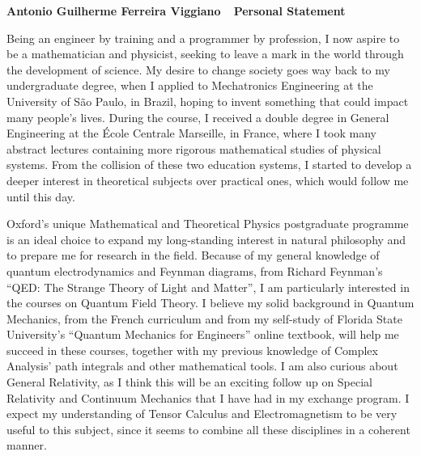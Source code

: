 \documentclass[10pt]{article}
\def\firstname{Antonio Guilherme }
\def\familyname{Ferreira Viggiano}
\def\subj{Personal Statement}
\def\FileTitle{\firstname\familyname~\textemdash~\subj}
\begin{document}
\sffamily %

{\bfseries \FileTitle}

Being an engineer by training and a programmer by profession, I now aspire to be a mathematician and physicist, seeking to leave a mark in the world through the development of science. My desire to change society goes way back to my undergraduate degree, when I applied to Mechatronics Engineering at the University of São Paulo, in Brazil, hoping to invent something that could impact many people's lives. During the course, I received a double degree in General Engineering at the École Centrale Marseille, in France, where I took many abstract lectures containing more rigorous mathematical studies of physical systems. From the collision of these two education systems, I started to develop a deeper interest in theoretical subjects over practical ones, which would follow me until this day.

Oxford's unique Mathematical and Theoretical Physics postgraduate programme is an ideal choice to expand my long-standing interest in natural philosophy and to prepare me for research in the field. Because of my general knowledge of quantum electrodynamics and Feynman diagrams, from Richard Feynman's ``QED: The Strange Theory of Light and Matter'', I am particularly interested in the courses on Quantum Field Theory. I believe my solid background in Quantum Mechanics, from the French curriculum and from my self-study of Florida State University's ``Quantum Mechanics for Engineers'' online textbook, will help me succeed in these courses, together with my previous knowledge of Complex Analysis' path integrals and other mathematical tools. I am also curious about General Relativity, as I think this will be an exciting follow up on Special Relativity and Continuum Mechanics that I have had in my exchange program. I expect my understanding of Tensor Calculus and Electromagnetism to be very useful to this subject, since it seems to combine all these disciplines in a coherent manner.                
\end{document}
